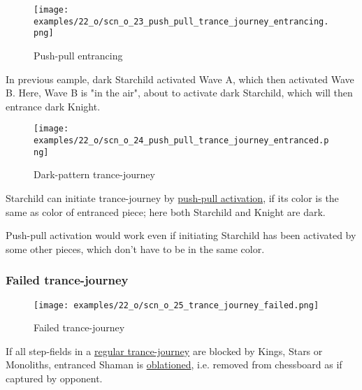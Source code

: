 \vspace*{3.9\baselineskip} %
\noindent
\begin{wrapfigure}[10]{l}{0.4\textwidth} %
\centering
\texttt{[image: examples/22\_o/scn\_o\_23\_push\_pull\_trance\_journey\_entrancing.png]}
\caption{Push-pull entrancing}
\label{fig:scn_o_23_push_pull_trance_journey_entrancing}
\end{wrapfigure}
In previous eample, dark Starchild activated Wave A, which then activated Wave B. Here, Wave B is
"in the air", about to activate dark Starchild, which will then entrance dark Knight.

\clearpage %

\noindent
\begin{figure}[!h]
\texttt{[image: examples/22\_o/scn\_o\_24\_push\_pull\_trance\_journey\_entranced.png]}
\caption{Dark-pattern trance-journey}
\label{fig:scn_o_24_push_pull_trance_journey_entranced}
\end{figure}

Starchild can initiate trance-journey by
\hyperref[sec:Terms/Push-pull activation]{push-pull activation},
if its color is the same as color of entranced piece; here both Starchild and Knight are dark.

Push-pull activation would work even if initiating Starchild has been activated by some other pieces,
which don't have to be in the same color.

\clearpage %

\subsubsection*{Failed trance-journey}

\vspace*{-1.1\baselineskip}
\noindent
\begin{figure}[!h]
\texttt{[image: examples/22\_o/scn\_o\_25\_trance\_journey\_failed.png]}
\caption{Failed trance-journey}
\label{fig:scn_o_25_trance_journey_failed}
\end{figure}

If all step-fields in a \hyperref[fig:scn_cot_09_trance_journey_init]{regular trance-journey} are
blocked by Kings, Stars or Monoliths, entranced Shaman is \hyperref[sec:Terms/Oblation]{oblationed},
i.e. removed from chessboard as if captured by opponent.


